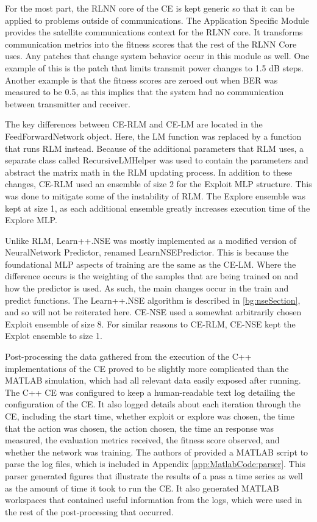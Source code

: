 \par For the most part, the RLNN core of the CE is kept generic so that it can be applied to problems outside of communications. The Application Specific Module provides the satellite communications context for the RLNN core. It transforms communication metrics into the fitness scores that the rest of the RLNN Core uses. Any patches that change system behavior occur in this module as well. One example of this is the patch that limits transmit power changes to 1.5 dB steps. Another example is that the fitness scores are zeroed out when BER was measured to be 0.5, as this implies that the system had no communication between transmitter and receiver. 
\par The key differences between CE-RLM and CE-LM are located in the FeedForwardNetwork object. Here, the LM function was replaced by a function that runs RLM instead. Because of the additional parameters that RLM uses, a separate class called RecursiveLMHelper was used to contain the parameters and abstract the matrix math in the RLM updating process. In addition to these changes, CE-RLM used an ensemble of size 2 for the Exploit MLP structure. This was done to mitigate some of the instability of RLM. The Explore ensemble was kept at size 1, as each additional ensemble greatly increases execution time of the Explore MLP.
\par Unlike RLM, Learn++.NSE was mostly implemented as a modified version of NeuralNetwork Predictor, renamed LearnNSEPredictor. This is because the foundational MLP aspects of training are the same as the CE-LM. Where the difference occurs is the weighting of the samples that are being trained on and how the predictor is used. As such, the main changes occur in the train and predict functions. The Learn++.NSE algorithm is described in \ref{bg:nseSection}, and so will not be reiterated here. CE-NSE used a somewhat arbitrarily chosen Exploit ensemble of size 8. For similar reasons to CE-RLM, CE-NSE kept the Explot ensemble to size 1.
\par Post-processing the data gathered from the execution of the C++ implementations of the CE proved to be slightly more complicated than the MATLAB simulation, which had all relevant data easily exposed after running. The C++ CE was configured to keep a human-readable text log detailing the configuration of the CE. It also logged details about each iteration through the CE, including the start time, whether exploit or explore was chosen, the time that the action was chosen, the action chosen, the time an response was measured, the evaluation metrics received, the fitness score observed, and whether the network was training. The authors of \cite{tim_implementation_paper} provided a MATLAB script to parse the log files, which is included in Appendix \ref{app:MatlabCode:parser}. This parser generated figures that illustrate the results of a pass a time series as well as the amount of time it took to run the CE. It also generated MATLAB workspaces that contained useful information from the logs, which were used in the rest of the post-processing that occurred.



